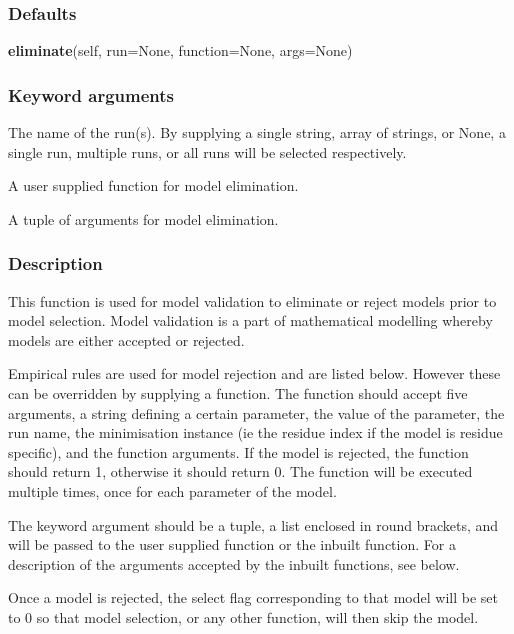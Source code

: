 \subsubsection{Defaults}

\textsf{\textbf{eliminate}(self, run=None, function=None, args=None)}


\subsubsection{Keyword arguments}

  The name of the run(s).  By supplying a single string, array of strings, or None, a single run, multiple runs, or all runs will be selected respectively. 

  A user supplied function for model elimination. 

  A tuple of arguments for model elimination. 




\subsubsection{Description}

This function is used for model validation to eliminate or reject models prior to model selection.  Model validation is a part of mathematical modelling whereby models are either accepted or rejected.


Empirical rules are used for model rejection and are listed below.  However these can be overridden by supplying a function.  The function should accept five arguments, a string defining a certain parameter, the value of the parameter, the run name, the minimisation instance (ie the residue index if the model is residue specific), and the function arguments.  If the model is rejected, the function should return 1, otherwise it should return 0.  The function will be executed multiple times, once for each parameter of the model.


The  keyword argument should be a tuple, a list enclosed in round brackets, and will be passed to the user supplied function or the inbuilt function.  For a description of the arguments accepted by the inbuilt functions, see below.


Once a model is rejected, the select flag corresponding to that model will be set to 0 so that model selection, or any other function, will then skip the model.



